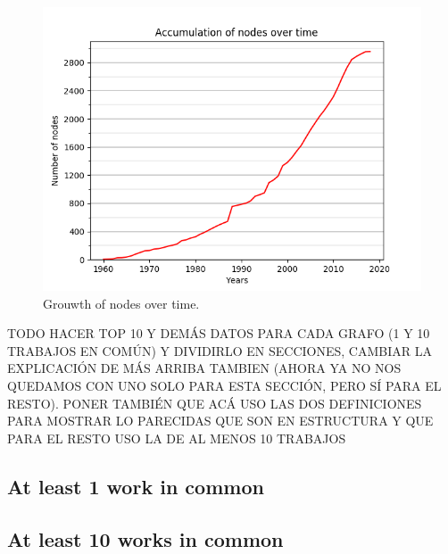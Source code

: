 \begin{figure}[!hbt]
	\begin{center}
	\includegraphics[width=\columnwidth]{graphics/nodesAccumulation.png}
	\caption{Grouwth of nodes over time.}
	\label{fig:accumulationNodes}
	\end{center}
\end{figure}

TODO HACER TOP 10 Y DEMÁS DATOS PARA CADA GRAFO (1 Y 10 TRABAJOS EN COMÚN) Y DIVIDIRLO EN SECCIONES, CAMBIAR LA EXPLICACIÓN DE MÁS ARRIBA TAMBIEN (AHORA YA NO NOS QUEDAMOS CON UNO SOLO PARA ESTA SECCIÓN, PERO SÍ PARA EL RESTO). PONER TAMBIÉN QUE ACÁ USO LAS DOS DEFINICIONES PARA MOSTRAR LO PARECIDAS QUE SON EN ESTRUCTURA Y QUE PARA EL RESTO USO LA DE AL MENOS 10 TRABAJOS

\subsection{At least 1 work in common}
\subsection{At least 10 works in common}


